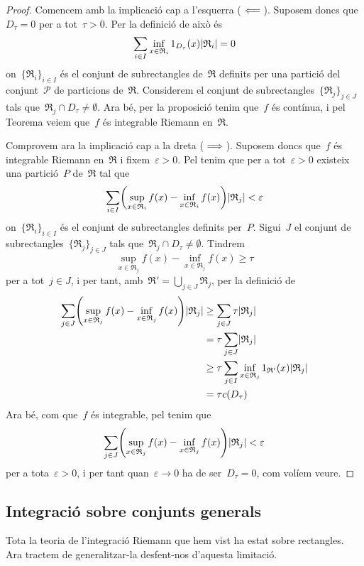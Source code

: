 \documentclass[../calcul-en-diverses-variables.tex]{subfiles}
\begin{document}
    \begin{proof}
        Comencem amb la implicació cap a l'esquerra (\(\impliedby\)).
        Suposem doncs que~\(D_{\tau}=0\) per a tot~\(\tau>0\).
        Per la definició de  això és
        \[
            \sum_{i\in I}\inf_{x\in \mathfrak{R}_{i}}1_{D_{\tau}}(x)\abs{\mathfrak{R}_{i}}=0
        \]
        on~\(\{\mathfrak{R}_{i}\}_{i\in I}\) és el conjunt de subrectangles de~\(\mathfrak{R}\) definits per una partició del conjunt~\(\mathcal{P}\) de particions de~\(\mathfrak{R}\).
        Considerem el conjunt de subrectangles~\(\{\mathfrak{R}_{j}\}_{j\in J}\) tals que~\(\mathfrak{R}_{j}\cap D_{\tau}\neq\emptyset\).
        Ara bé, per la proposició  tenim que~\(f\) és contínua, i pel Teorema  veiem que~\(f\) és integrable Riemann en~\(\mathfrak{R}\).

        Comprovem ara la implicació cap a la dreta (\(\implies\)).
        Suposem doncs que~\(f\) és integrable Riemann en~\(\mathfrak{R}\) i fixem~\(\varepsilon>0\).
        Pel  tenim que per a tot~\(\varepsilon>0\) existeix una partició~\(P\) de~\(\mathfrak{R}\) tal que
        \[
            \sum_{i\in I}\left(\sup_{x\in \mathfrak{R}_{i}}f(x)-\inf_{x\in \mathfrak{R}_{i}}f(x)\right)\abs{\mathfrak{R}_{j}}<\varepsilon
        \]
        on~\(\{\mathfrak{R}_{i}\}_{i\in I}\) és el conjunt de subrectangles definits per~\(P\).
        Sigui~\(J\) el conjunt de subrectangles~\(\{\mathfrak{R}_{j}\}_{j\in J}\) tals que~\(\mathfrak{R}_{j}\cap D_{\tau}\neq\emptyset\).
        Tindrem
        \[
            \sup_{x\in \mathfrak{R}_{j}}f(x)-\inf_{x\in \mathfrak{R}_{j}}f(x)\geq\tau
        \]
        per a tot~\(j\in J\), i per tant, amb~\(\mathfrak{R}'=\bigcup_{j\in J}\mathfrak{R}_{j}\), per la definició de 
        \begin{align*}
            \sum_{j\in J}\left(\sup_{x\in \mathfrak{R}_{j}}f(x)-\inf_{x\in \mathfrak{R}_{j}}f(x)\right)\abs{\mathfrak{R}_{j}}&\geq\sum_{j\in J}\tau\abs{\mathfrak{R}_{j}}\\
            &=\tau\sum_{j\in J}\abs{\mathfrak{R}_{j}}\\
            &\geq\tau\sum_{j\in I}\inf_{x\in \mathfrak{R}_{j}}1_{\mathfrak{R}'}(x)\abs{\mathfrak{R}_{j}}\\
            &=\tau c(D_{\tau})
        \end{align*}
        Ara bé, com que~\(f\) és integrable, pel  tenim que
        \[
            \sum_{j\in J}\left(\sup_{x\in \mathfrak{R}_{j}}f(x)-\inf_{x\in \mathfrak{R}_{j}}f(x)\right)\abs{\mathfrak{R}_{j}}<\varepsilon
        \]
        per a tota~\(\varepsilon>0\), i per tant quan~\(\varepsilon\to0\) ha de ser~\(D_{\tau}=0\), com volíem veure.
    \end{proof}
    \subsection{Integració sobre conjunts generals}
    \begin{note}
        Tota la teoria de l'integració Riemann que hem vist ha estat sobre rectangles.
        Ara tractem de generalitzar-la desfent-nos d'aquesta limitació.
    \end{note}
\end{document}
